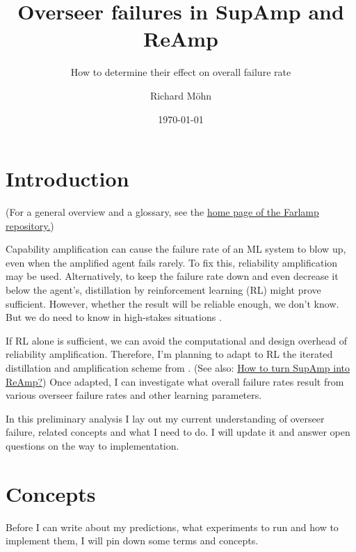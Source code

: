 \documentclass{farlamp}
\title{Overseer failures in SupAmp and ReAmp}
\subtitle{How to determine their effect on overall failure rate}
\author{Richard Möhn}
\date{\today}
\begin{document}
\maketitle
\tableofcontents

\section{Introduction}

(For a general overview and a glossary, see the
\href{https://github.com/rmoehn/farlamp}{home page of the Farlamp
repository.})

Capability amplification can cause the failure rate of an ML system to blow up,
even when the amplified agent fails rarely. To fix this, reliability
amplification may be used. Alternatively, to keep the failure rate down and even
decrease it below the agent's, distillation by reinforcement learning (RL) might
prove sufficient. However, whether the result will be reliable enough, we don't
know.~\parencite{ChriRelAmp} But we do need to know in high-stakes situations
\parencite[see][]{ChriLearnCata}.

If RL alone is sufficient, we can avoid the computational and design overhead of
reliability amplification. Therefore, I'm planning to adapt to RL the iterated
distillation and amplification scheme from \textcite{CSASupAmp}. (See also:
\href{https://github.com/rmoehn/farlamp/raw/master/supamp-reamp.pdf}{How to turn
SupAmp into ReAmp?}) Once adapted, I can investigate what overall failure rates
result from various overseer failure rates and other learning parameters.

In this preliminary analysis I lay out my current understanding of overseer
failure, related concepts and what I need to do. I will update it and answer
open questions on the way to implementation.


\section{Concepts}

Before I can write about my predictions, what experiments to run and how to
implement them, I will pin down some terms and concepts.

\end{document}
